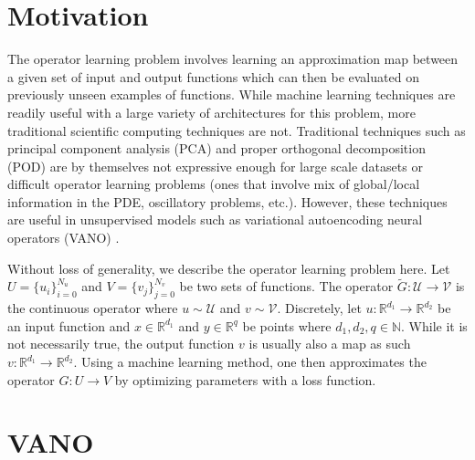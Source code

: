 \documentclass[11pt, fullpage,letterpaper]{article}
\begin{document}

\section{Motivation}
The operator learning problem involves learning an approximation map between a given set of input and output functions \cite{Lu_2021, fair_paper} which can then be evaluated on previously unseen examples of functions. While machine learning techniques are readily useful with a large variety of architectures for this problem, more traditional scientific computing techniques are not. Traditional techniques such as principal component analysis (PCA) and proper orthogonal decomposition (POD) are by themselves not expressive enough for large scale datasets or difficult operator learning problems (ones that involve mix of global/local information in the PDE, oscillatory problems, etc.). However, these techniques are useful in unsupervised models such as variational autoencoding neural operators (VANO) \cite{seidman2023variational}.   

Without loss of generality, we describe the operator learning problem here. Let $U=\{u_i\}_{i=0}^{N_u}$ and $V=\{v_j\}_{j=0}^{N_v}$ be two sets of functions. The operator $\tilde{G}: \mathcal{U} \rightarrow \mathcal{V}$ is the continuous operator where $u \sim \mathcal{U}$ and $v \sim \mathcal{V}$. Discretely, let $u: \mathbb{R}^{d_1} \rightarrow \mathbb{R}^{d_2}$ be an input function and $x \in \mathbb{R}^{d_1}$ and $y \in \mathbb{R}^{q}$ be points where $d_{1}, d_2, q \in \mathbb{N}$. While it is not necessarily true, the output function $v$ is usually also a map as such $v: \mathbb{R}^{d_1} \rightarrow \mathbb{R}^{d_2}$. Using a machine learning method, one then approximates the operator $G: U \rightarrow V$ by optimizing parameters with a loss function.

\section{VANO}
\end{document}
